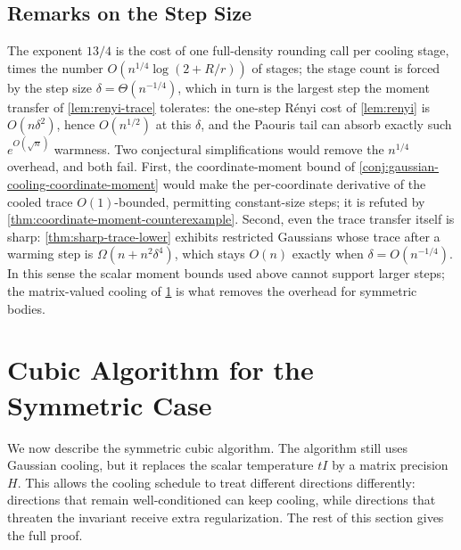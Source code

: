 \documentclass[11pt]{article}
\numberwithin{equation}{section}
\theoremstyle{definition}
\begin{document}
\subsection{Remarks on the Step Size}
\label{sec:step-size-remarks}

The exponent $13/4$ is the cost of one full-density rounding call per cooling
stage, times the number
$O(n^{1/4}\log(2+R/r))$ of stages; the stage count is forced by the step size
$\delta=\Theta(n^{-1/4})$, which in turn is the largest step the moment transfer
of \cref{lem:renyi-trace} tolerates: the one-step R\'enyi cost of
\cref{lem:renyi} is
$O(n\delta^2)$, hence
$O(n^{1/2})$ at this
$\delta$, and the Paouris tail can absorb exactly such
$e^{O(\sqrt n)}$ warmness.
Two conjectural simplifications would remove the $n^{1/4}$ overhead, and both
fail.
First, the coordinate-moment bound of
\cref{conj:gaussian-cooling-coordinate-moment} would make the per-coordinate
derivative of the cooled trace $O(1)$-bounded, permitting constant-size steps;
it is refuted by \cref{thm:coordinate-moment-counterexample}.
Second, even the trace transfer itself is sharp: \cref{thm:sharp-trace-lower}
exhibits restricted Gaussians whose trace after a warming step is
$\Omega(n+n^2\delta^4)$, which stays
$O(n)$ exactly when
$\delta=O(n^{-1/4})$.
In this sense the scalar moment bounds used above cannot support larger steps;
the matrix-valued cooling of \cref{sec:symmetric} is what removes the overhead
for symmetric bodies.

\section{Cubic Algorithm for the Symmetric Case}
\label{sec:symmetric}

We now describe the symmetric cubic algorithm.
The algorithm still uses Gaussian cooling, but it replaces the scalar
temperature $tI$ by a matrix precision
$H$.
This allows the cooling schedule to treat different directions differently:
directions that remain well-conditioned can keep cooling, while directions that
threaten the invariant receive extra regularization.
The rest of this section gives the full proof.
\end{document}
